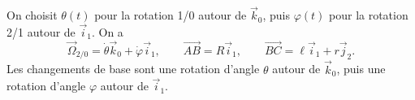 \begin{corrigebox}
On choisit $\theta(t)$ pour la rotation 1/0 autour de $\vec k_0$, puis
$\varphi(t)$ pour la rotation 2/1 autour de $\vec i_1$. On a
\[\vec\Omega_{2/0}=\dot\theta\vec k_0+\dot\varphi\vec i_1,\qquad
  \overrightarrow{AB}=R\vec i_1,\qquad
  \overrightarrow{BC}=\ell\vec i_1+r\vec j_2.\]
Les changements de base sont une rotation d'angle $\theta$ autour de
$\vec k_0$, puis une rotation d'angle $\varphi$ autour de $\vec i_1$.
\end{corrigebox}
